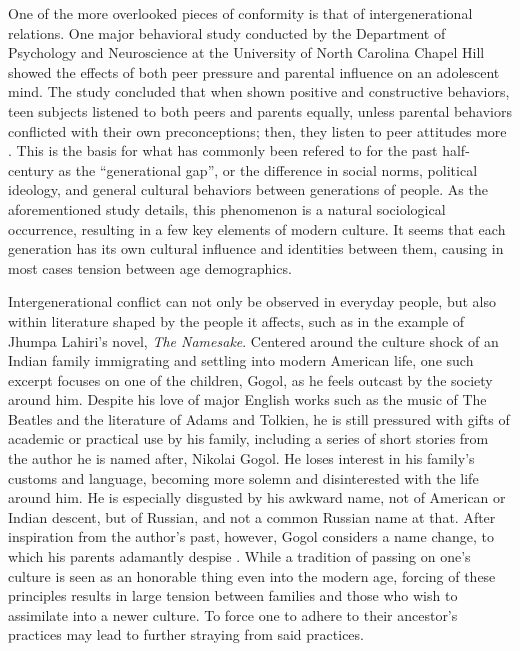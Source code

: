 \documentclass[12pt,letterpaper]{report}
\begin{document}
  \par One of the more overlooked pieces of conformity is that of intergenerational relations. One major behavioral study conducted by the Department of Psychology and Neuroscience at the University of North Carolina Chapel Hill showed the effects of both peer pressure and parental influence on an adolescent mind. The study concluded that when shown positive and constructive behaviors, teen subjects listened to both peers and parents equally, unless parental behaviors conflicted with their own preconceptions; then, they listen to peer attitudes more \citep{KTDo2020}. This is the basis for what has commonly been refered to for the past half-century as the ``generational gap'', or the difference in social norms, political ideology, and general cultural behaviors between generations of people. As the aforementioned study details, this phenomenon is a natural sociological occurrence, resulting in a few key elements of modern culture. It seems that each generation has its own cultural influence and identities between them, causing in most cases tension between age demographics.
  \par Intergenerational conflict can not only be observed in everyday people, but also within literature shaped by the people it affects, such as in the example of Jhumpa Lahiri's novel, \textit{The Namesake}. Centered around the culture shock of an Indian family immigrating and settling into modern American life, one such excerpt focuses on one of the children, Gogol, as he feels outcast by the society around him. Despite his love of major English works such as the music of The Beatles and the literature of Adams and Tolkien, he is still pressured with gifts of academic or practical use by his family, including a series of short stories from the author he is named after, Nikolai Gogol. He loses interest in his family's customs and language, becoming more solemn and disinterested with the life around him. He is especially disgusted by his awkward name, not of American or Indian descent, but of Russian, and not a common Russian name at that. After inspiration from the author's past, however, Gogol considers a name change, to which his parents adamantly despise \citep{Lahiri2003}. While a tradition of passing on one's culture is seen as an honorable thing even into the modern age, forcing of these principles results in large tension between families and those who wish to assimilate into a newer culture. To force one to adhere to their ancestor's practices may lead to further straying from said practices.
\end{document}
